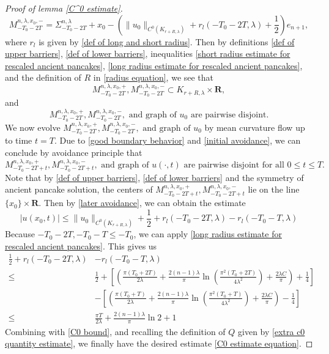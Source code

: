 \documentclass[pdflatex,sn-mathphys-num]{sn-jnl}%
\begin{document}
\begin{proof}[Proof of lemma \ref{C^0 estimate}]
\begin{equation}
    M^{n, \lambda, x_0, -}_{-T_0 - 2T } = \Sigma^{n, \lambda}_{-T_0 -2T}  + x_0 - (\|u_0\|_{C^0(K_{r + R, \lambda})} + r_l(-T_0-2T, \lambda) + \frac{1}{2})e_{n+1},
\end{equation}
where $r_l$ is given by \eqref{def of long and short radius}. 
Then by definitions \eqref{def of upper barriers}, \eqref{def of lower barriers}, inequalities \eqref{short radius estimate for rescaled ancient pancakes}, \eqref{long radius estimate for rescaled ancient pancakes}, and the definition of $R$ in \eqref{radius equation}, we see that
\begin{equation}\label{good boundary behavior}
    M^{n, \lambda, x_0,+}_{-T_0 - 2T},M^{n, \lambda, x_0,-}_{-T_0 - 2T} \subset K_{r + R, \lambda} \times \mathbf{R},
\end{equation}
and 
\begin{equation}\label{initial avoidance}
     M^{n, \lambda, x_0,+}_{-T_0 - 2T},M^{n, \lambda, x_0,-}_{-T_0 - 2T}, \text{ and graph of }u_0 \text{ are pairwise disjoint}.
\end{equation}
We now evolve $M^{n, \lambda, x_0,+}_{-T_0 - 2T},M^{n, \lambda, x_0,-}_{-T_0 - 2T}, \text{ and graph of }u_0$ by mean curvature flow up to time $t = T$. Due to \eqref{good boundary behavior} and \eqref{initial avoidance}, we can conclude by avoidance principle that  
\begin{equation}\label{later avoidance}
     M^{n, \lambda, x_0,+}_{-T_0 - 2T + t},M^{n, \lambda, x_0,-}_{-T_0 - 2T+ t}, \text{ and graph of }u(\cdot, t) \text{ are pairwise disjoint for all }0 \leq t \leq T.
\end{equation}
Note that by \eqref{def of upper barriers}, \eqref{def of lower barriers} and the symmetry of ancient pancake solution, the centers of $M^{n, \lambda, x_0,+}_{-T_0 - 2T + t},M^{n, \lambda, x_0,-}_{-T_0 - 2T+ t}$ lie on the line $\{x_0\} \times \mathbf{R}$. Then by \eqref{later avoidance}, we can obtain the estimate
\begin{equation}\label{C0 bound}
    |u(x_0, t)| \leq \|u_0\|_{C^0(K_{ r + R, \lambda})} + \frac{1}{2} + r_l(-T_0 - 2T, \lambda) - r_l(-T_0 -T, \lambda)
\end{equation}
Because $-T_0 - 2T, -T_0 - T \leq -T_0$, we can apply \eqref{long radius estimate for rescaled ancient pancakes}. This gives us 
\begin{align*}
        \frac{1}{2} + r_l(-T_0 - 2T, \lambda) &- r_l(-T_0 -T, \lambda)  \\ \leq &\frac{1}{2} + [(\frac{\pi (T_0 + 2T)}{2\lambda}+ \frac{2(n-1)\lambda}{\pi}\ln(\frac{\pi^2(T_0 + 2T)}{4\lambda^2}) + \frac{2\lambda C}{\pi}) + \frac{1}{4}]\\ & - [(\frac{\pi (T_0 + T)}{2\lambda}+ \frac{2(n-1)\lambda}{\pi}\ln(\frac{\pi^2(T_0 + T)}{4\lambda^2}) + \frac{2\lambda C}{\pi}) - \frac{1}{4}]\\ \leq & \frac{\pi T}{2\lambda} + \frac{2(n-1)\lambda}{\pi}\ln 2 + 1
\end{align*}
Combining with \eqref{C0 bound}, and recalling the definition of $Q$ given by \eqref{extra c0 quantity estimate}, we finally have the desired estimate \eqref{C0 estimate equation}.
\end{proof}
\end{document}
